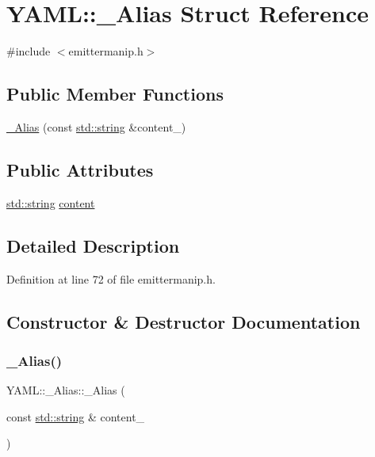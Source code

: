 \hypertarget{struct_y_a_m_l_1_1___alias}{}\section{Y\+A\+ML\+::\+\_\+\+Alias Struct Reference}
\label{struct_y_a_m_l_1_1___alias}


{\ttfamily \#include $<$emittermanip.\+h$>$}

\subsection*{Public Member Functions}
\begin{DoxyCompactItemize}
\item 
\mbox{\hyperlink{struct_y_a_m_l_1_1___alias_a17f1514d0d0fd67f207458eeaee2103a}{\+\_\+\+Alias}} (const \mbox{\hyperlink{glad_8h_ac83513893df92266f79a515488701770}{std\+::string}} \&content\+\_\+)
\end{DoxyCompactItemize}
\subsection*{Public Attributes}
\begin{DoxyCompactItemize}
\item 
\mbox{\hyperlink{glad_8h_ac83513893df92266f79a515488701770}{std\+::string}} \mbox{\hyperlink{struct_y_a_m_l_1_1___alias_abd333929416f264664d316fa902be42c}{content}}
\end{DoxyCompactItemize}


\subsection{Detailed Description}


Definition at line 72 of file emittermanip.\+h.



\subsection{Constructor \& Destructor Documentation}
\mbox{\label{struct_y_a_m_l_1_1___alias_a17f1514d0d0fd67f207458eeaee2103a}} 
\subsubsection{\texorpdfstring{\_Alias()}{\_Alias()}}
{\footnotesize\ttfamily Y\+A\+M\+L\+::\+\_\+\+Alias\+::\+\_\+\+Alias (\begin{DoxyParamCaption}\item[{const \mbox{\hyperlink{glad_8h_ac83513893df92266f79a515488701770}{std\+::string}} \&}]{content\+\_\+ }\end{DoxyParamCaption})\hspace{0.3cm}{\ttfamily [inline]}}



